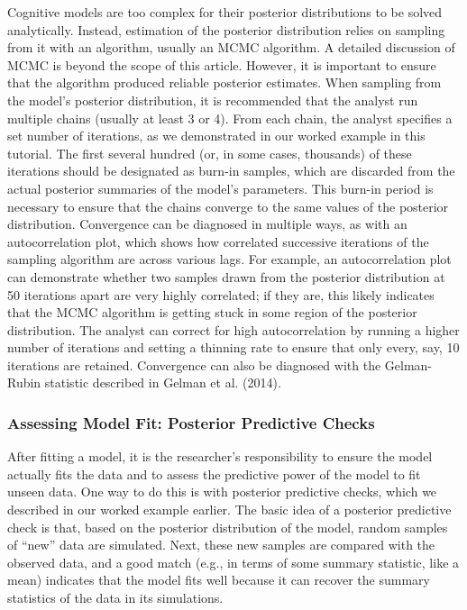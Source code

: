 \documentclass[
  english,
  ,man,floatsintext]{apa6}
\begin{document}
Cognitive models are too complex for their posterior distributions to be solved analytically. Instead, estimation of the posterior distribution relies on sampling from it with an algorithm, usually an MCMC algorithm. A detailed discussion of MCMC is beyond the scope of this article. However, it is important to ensure that the algorithm produced reliable posterior estimates. When sampling from the model's posterior distribution, it is recommended that the analyst run multiple chains (usually at least 3 or 4). From each chain, the analyst specifies a set number of iterations, as we demonstrated in our worked example in this tutorial. The first several hundred (or, in some cases, thousands) of these iterations should be designated as burn-in samples, which are discarded from the actual posterior summaries of the model's parameters. This burn-in period is necessary to ensure that the chains converge to the same values of the posterior distribution. Convergence can be diagnosed in multiple ways, as with an autocorrelation plot, which shows how correlated successive iterations of the sampling algorithm are across various lags. For example, an autocorrelation plot can demonstrate whether two samples drawn from the posterior distribution at 50 iterations apart are very highly correlated; if they are, this likely indicates that the MCMC algorithm is getting stuck in some region of the posterior distribution. The analyst can correct for high autocorrelation by running a higher number of iterations and setting a thinning rate to ensure that only every, say, 10 iterations are retained. Convergence can also be diagnosed with the Gelman-Rubin statistic described in Gelman et al. (2014).

\hypertarget{assessing-model-fit-posterior-predictive-checks}{%
\subsubsection{Assessing Model Fit: Posterior Predictive Checks}\label{assessing-model-fit-posterior-predictive-checks}}

After fitting a model, it is the researcher's responsibility to ensure the model actually fits the data and to assess the predictive power of the model to fit unseen data. One way to do this is with posterior predictive checks, which we described in our worked example earlier. The basic idea of a posterior predictive check is that, based on the posterior distribution of the model, random samples of \enquote{new} data are simulated. Next, these new samples are compared with the observed data, and a good match (e.g., in terms of some summary statistic, like a mean) indicates that the model fits well because it can recover the summary statistics of the data in its simulations.
\end{document}
